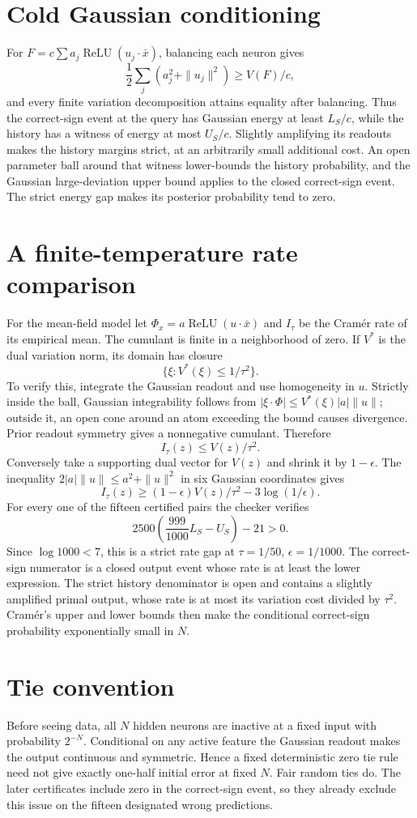 \documentclass[11pt]{article}
\newcommand{\relu}{\operatorname{ReLU}}
\begin{document}
\section{Cold Gaussian conditioning}
For $F=c\sum a_j\relu(u_j\cdot\bar x)$, balancing each neuron gives
\[
 \frac12\sum_j(a_j^2+\|u_j\|^2)\ge V(F)/c,
\]
and every finite variation decomposition attains equality after balancing.
Thus the correct-sign event at the query has Gaussian energy at least
$L_S/c$, while the history has a witness of energy at most $U_S/c$.
Slightly amplifying its readouts makes the history margins strict, at an
arbitrarily small additional cost. An open parameter ball around that
witness lower-bounds the history probability, and the Gaussian
large-deviation upper bound applies to the closed correct-sign event.
The strict energy gap makes its posterior probability tend to zero.

\section{A finite-temperature rate comparison}
For the mean-field model let $\Phi_x=a\relu(u\cdot\bar x)$ and
$I_\tau$ be the Cram\'er rate of its empirical mean. The cumulant is
finite in a neighborhood of zero. If $V^*$ is the dual variation norm,
its domain has closure
\[
 \{\xi:V^*(\xi)\le1/\tau^2\}.
\]
To verify this, integrate the Gaussian readout and use homogeneity in
$u$. Strictly inside the ball, Gaussian integrability follows from
$|\xi\cdot\Phi|\le V^*(\xi)|a|\|u\|$; outside it, an open cone
around an atom exceeding the bound causes divergence. Prior readout
symmetry gives a nonnegative cumulant. Therefore
\[
 I_\tau(z)\le V(z)/\tau^2.
\]
Conversely take a supporting dual vector for $V(z)$ and shrink it by
$1-\epsilon$. The inequality
$2|a|\|u\|\le a^2+\|u\|^2$ in six Gaussian coordinates gives
\[
 I_\tau(z)\ge(1-\epsilon)V(z)/\tau^2-3\log(1/\epsilon).
\]
For every one of the fifteen certified pairs the checker verifies
\[
 2500\left(\frac{999}{1000}L_S-U_S\right)-21>0.
\]
Since $\log1000<7$, this is a strict rate gap at
$\tau=1/50$, $\epsilon=1/1000$. The correct-sign numerator is a closed
output event whose rate is at least the lower expression. The strict
history denominator is open and contains a slightly amplified primal
output, whose rate is at most its variation cost divided by $\tau^2$.
Cram\'er's upper and lower bounds then make the conditional correct-sign
probability exponentially small in $N$.

\section{Tie convention}
Before seeing data, all $N$ hidden neurons are inactive at a fixed input
with probability $2^{-N}$. Conditional on any active feature the
Gaussian readout makes the output continuous and symmetric. Hence a
fixed deterministic zero tie rule need not give exactly one-half initial
error at fixed $N$. Fair random ties do. The later certificates include
zero in the correct-sign event, so they already exclude this issue on
the fifteen designated wrong predictions.
\end{document}
